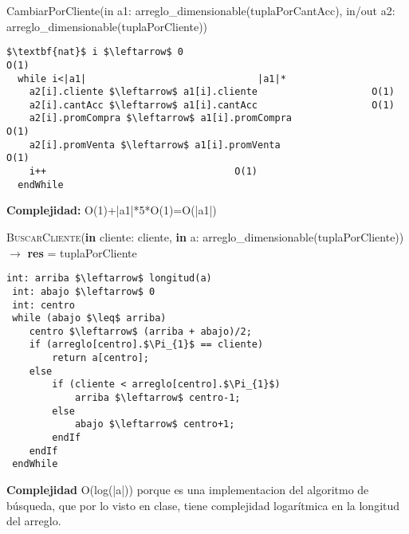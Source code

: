 CambiarPorCliente(in a1: arreglo\_dimensionable(tuplaPorCantAcc), in/out a2: arreglo\_dimensionable(tuplaPorCliente))
\begin{lstlisting}[mathescape]
  $\textbf{nat}$ i $\leftarrow$ 0										O(1)
  while i<|a1|								|a1|*
    a2[i].cliente $\leftarrow$ a1[i].cliente					O(1)
    a2[i].cantAcc $\leftarrow$ a1[i].cantAcc					O(1)
    a2[i].promCompra $\leftarrow$ a1[i].promCompra					O(1)
    a2[i].promVenta $\leftarrow$ a1[i].promVenta					O(1)
    i++									O(1)
  endWhile
\end{lstlisting}
\textbf{Complejidad:} O(1)+|a1|*5*O(1)=O(|a1|)

\textsc{BuscarCliente}(\textbf{in} cliente: cliente, \textbf{in} a: arreglo\_dimensionable(tuplaPorCliente)) $\rightarrow$ \textbf{res} = tuplaPorCliente
\begin{lstlisting}[mathescape]
 int: arriba $\leftarrow$ longitud(a)
 int: abajo $\leftarrow$ 0
 int: centro
 while (abajo $\leq$ arriba)
 	centro $\leftarrow$ (arriba + abajo)/2;
    if (arreglo[centro].$\Pi_{1}$ == cliente)
 		return a[centro];
    else
 		if (cliente < arreglo[centro].$\Pi_{1}$)
   			arriba $\leftarrow$ centro-1;
 		else
   			abajo $\leftarrow$ centro+1;
   		endIf
   	endIf
 endWhile
\end{lstlisting}
\textbf{Complejidad} O(log(|a|)) porque es una implementacion del algoritmo de b\'usqueda, que por lo visto en clase, tiene complejidad logar\'itmica en la longitud del arreglo.\\

